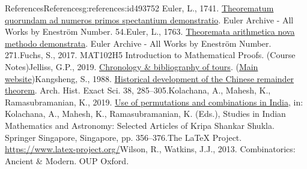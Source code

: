\documentclass[oneside,10pt,]{book}
\numberwithin{equation}{section}
\begin{document}
\begin{references-chapter-numberless}{References}{}{References}{}{}{g:references:id493752}
Euler, L., 1741. \href{https://scholarlycommons.pacific.edu/euler-works/54/}{Theorematum quorundam ad numeros primos spectantium demonstratio}. Euler Archive - All Works by Eneström Number. 54.Euler, L., 1763. \href{https://scholarlycommons.pacific.edu/euler-works/271/}{Theoremata arithmetica nova methodo demonstrata}. Euler Archive - All Works by Eneström Number. 271.Fuchs, S., 2017. MAT102H5 Introduction to Mathematical Proofs. (Course Notes)Jelliss, G.P., 2019. \href{https://www.mayhematics.com/p/KTN12_Bibliography.pdf}{Chronology \& bibliography of tours}. (\href{https://www.mayhematics.com/p/p.htm}{Main website})Kangsheng, S., 1988. \href{https://doi.org/10.1007/BF00357063}{Historical development of the Chinese remainder theorem}. Arch. Hist. Exact Sci. 38, 285–305.Kolachana, A., Mahesh, K., Ramasubramanian, K., 2019. \href{https://doi.org/10.1007/978-981-13-7326-8_18}{Use of permutations and combinations in India}, in: Kolachana, A., Mahesh, K., Ramasubramanian, K. (Eds.), Studies in Indian Mathematics and Astronomy: Selected Articles of Kripa Shankar Shukla. Springer Singapore, Singapore, pp. 356–376.The LaTeX Project. \href{https://www.latex-project.org/}{https:\slash{}\slash{}www.latex-project.org\slash{}}Wilson, R., Watkins, J.J., 2013. Combinatorics: Ancient \& Modern. OUP Oxford.\end{references-chapter-numberless}
\end{document}

